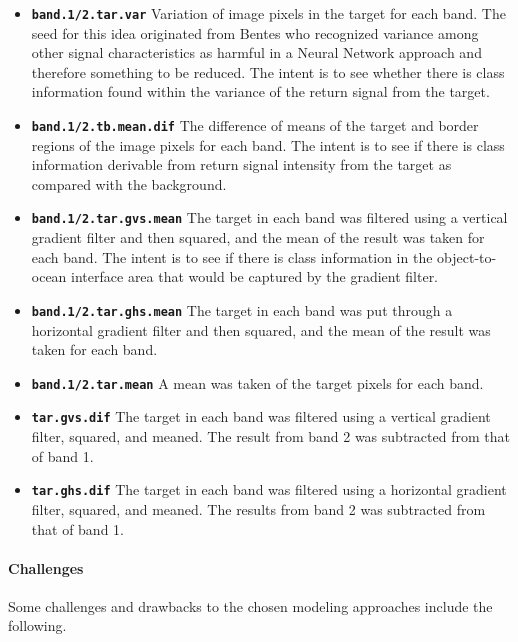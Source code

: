 \documentclass[fleqn,10pt]{SelfArx} %
\begin{document}
\begin{itemize}
	\item{\textbf{\texttt{band.1/2.tar.var}}} Variation of image pixels in the target for each band.  The seed for this idea originated from Bentes \cite{Ship-Iceberg_CNN} who recognized variance among other signal characteristics as harmful in a Neural Network approach and therefore something to be reduced.  The intent is to see whether there is class information found within the variance of the return signal from the target.
	\item{\textbf{\texttt{band.1/2.tb.mean.dif}}} The difference of means of the target and border regions of the image pixels for each band.  The intent is to see if there is class information derivable from return signal intensity from the target as compared with the background.
	\item{\textbf{\texttt{band.1/2.tar.gvs.mean}}} The target in each band was filtered using a vertical gradient filter and then squared, and the mean of the result was taken for each band.  The intent is to see if there is class information in the object-to-ocean interface area that would be captured by the gradient filter.
	\item{\textbf{\texttt{band.1/2.tar.ghs.mean}}} The target in each band was put through a horizontal gradient filter and then squared, and the mean of the result was taken for each band.
	\item{\textbf{\texttt{band.1/2.tar.mean}}} A mean was taken of the target pixels for each band.
	\item{\textbf{\texttt{tar.gvs.dif}}} The target in each band was filtered using a vertical gradient filter, squared, and meaned.  The result from band 2 was subtracted from that of band 1.
	\item{\textbf{\texttt{tar.ghs.dif}}} The target in each band was filtered using a horizontal gradient filter, squared, and meaned.  The results from band 2 was subtracted from that of band 1.
\end{itemize}

\paragraph{Challenges} Some challenges and drawbacks to the chosen modeling approaches include the following.
\end{document}
